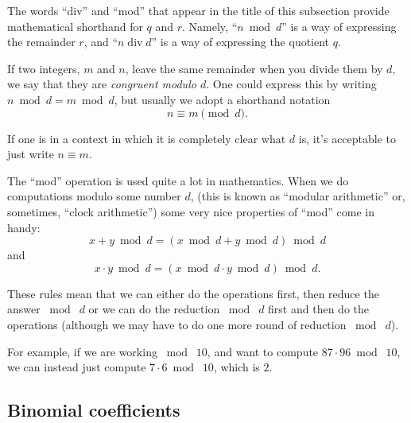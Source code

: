 \documentclass[10pt,]{book}
\theoremstyle{plain}
\theoremstyle{definition}
\theoremstyle{definition}
\numberwithin{equation}{section}
\newcommand{\tdiv}{\; \mbox{div} \;}
\begin{document}
      The words ``div'' and ``mod'' that appear in the title of this
      subsection provide mathematical shorthand for \(q\) and \(r\). Namely,
      ``\(n \bmod d\)'' is a way of expressing the remainder \(r\), and ``\(n
      \tdiv d\)'' is a way of expressing the quotient \(q\).
\par

      If two integers, \(m\) and \(n\), leave the same remainder when you
      divide them by \(d\), we say that they are 
      \emph{congruent modulo \(d\)}.
      One could express this by writing \(n \bmod d = m \bmod d\), but usually
      we adopt a shorthand notation
      \begin{equation*}
        n \equiv m \pmod{d}.
      \end{equation*}
\par

      If one is in a context in which it is completely clear what \(d\) is, it's
      acceptable to just write \(n \equiv m\).
\par

      The ``mod'' operation is used quite a lot in mathematics. When we do
      computations modulo some number \(d\), (this is known as ``modular arithmetic''
      or, sometimes, ``clock arithmetic'') some very nice properties of ``mod''
      come in handy:
      \begin{equation*}
        x + y \bmod d = ( x \bmod d + y \bmod d ) \bmod d
      \end{equation*}
      and
      \begin{equation*}
        x \cdot y \bmod d = ( x \bmod d \cdot y \bmod d ) \bmod d.
      \end{equation*}
\par

      These rules mean that we can either do the operations first, then
      reduce the answer \(\bmod\; d\) or we can do the reduction \(\bmod\; d\)
      first and then do the operations (although we may have to do one
      more round of reduction \(\bmod\; d\)).
\par

      For example, if we are working \(\bmod\; 10\), and want to compute
      \(87 \cdot 96 \bmod\; 10\), we can instead just compute \(7 \cdot 6 \bmod\; 10\),
      which is \(2\).
\typeout{************************************************}
\typeout{************************************************}
\subsection[{Binomial coefficients}]{Binomial coefficients}\label{binom_coeff}
\end{document}
